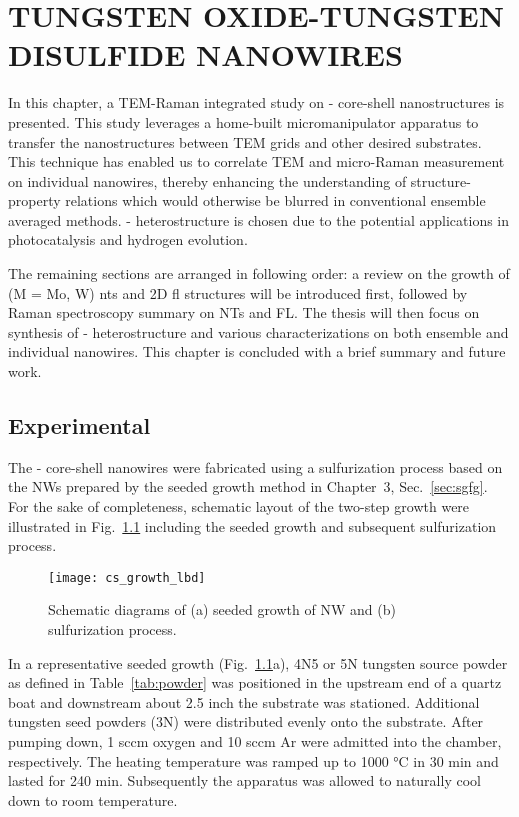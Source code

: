 \chapter{TUNGSTEN OXIDE-TUNGSTEN DISULFIDE NANOWIRES}

In this chapter, a TEM-Raman integrated study on - core-shell nanostructures is presented. This study leverages a home-built micromanipulator apparatus to transfer the nanostructures between TEM grids and other desired substrates. This technique has enabled us to correlate TEM and micro-Raman measurement on individual nanowires, thereby enhancing the understanding of structure-property relations which would otherwise be blurred in conventional ensemble averaged methods. - heterostructure is chosen due to the potential applications in photocatalysis and hydrogen evolution. 

The remaining sections are arranged in following order: a review on the growth of  (M = Mo, W) \glspl{nt} and 2D \gls{fl} structures will be introduced first, followed by Raman spectroscopy summary on  NTs and FL. The thesis will then focus on synthesis of - heterostructure and various characterizations on both ensemble and individual nanowires. This chapter is concluded with a brief summary and future work.



\section{Experimental}

The - core-shell nanowires were fabricated using a sulfurization process based on the  NWs prepared by the seeded growth method in Chapter~3, Sec.~\ref{sec:sgfg}. For the sake of completeness, schematic layout of the two-step growth were illustrated in Fig.~\ref{fig:ch5grow} including the seeded growth and subsequent sulfurization process.
\begin{figure}[htb]
\centering
\texttt{[image: cs\_growth\_lbd]}
\caption[Schematic diagrams of seeded growth of  NW and sulfurization process]{Schematic diagrams of (a) seeded growth of  NW and (b) sulfurization process. }
\label{fig:ch5grow}
\end{figure}
In a representative seeded growth (Fig.~\ref{fig:ch5grow}a), 4N5 or 5N tungsten source powder as defined in Table~\ref{tab:powder} was positioned in the upstream end of a quartz boat and downstream about 2.5 inch the substrate was stationed. Additional tungsten seed powders (3N) were distributed evenly onto the substrate. After pumping down, 1 sccm oxygen and 10 sccm Ar were admitted into the chamber, respectively. The heating temperature was ramped up to 1000 \si{\degreeCelsius} in 30 min and lasted for 240 min. Subsequently the apparatus was allowed to naturally cool down to room temperature. 

